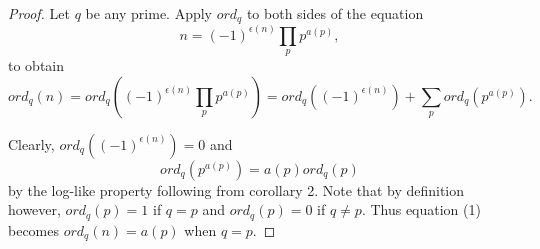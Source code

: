 \documentclass{article}
\theoremstyle{problemstyle}
\begin{document}
\begin{proof}
Let $q$ be any prime. Apply $ord_q$ to both sides of the equation
\begin{equation*}n = (-1)^{\epsilon(n)}\prod_pp^{a(p)}, \end{equation*} 
to obtain 
\setcounter{equation}{0}
\begin{equation}ord_q(n) = ord_q((-1)^{\epsilon(n)}\prod_pp^{a(p)}) = ord_q((-1)^{\epsilon(n)})+ \sum_pord_q(p^{a(p)}).  \end{equation} 

Clearly, $ord_q((-1)^{\epsilon(n)}) = 0$ and $$ord_q(p^{a(p)}) = a(p)ord_q(p)$$ by the log-like property following from corollary 2. Note that by definition however,  $ord_q(p) = 1$ if $q = p$ and $ord_q(p) = 0$ if $q \neq p$. Thus
equation (1) becomes $ord_q(n) = a(p)$ when $q = p$. 
\end{proof}
\end{document}
